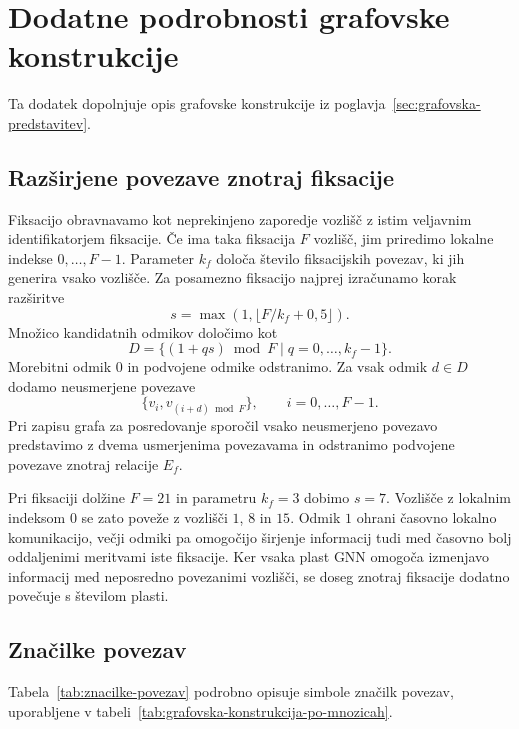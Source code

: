 \chapter{Dodatne podrobnosti grafovske konstrukcije}
\label{app:grafi}

Ta dodatek dopolnjuje opis grafovske konstrukcije iz poglavja~\ref{sec:grafovska-predstavitev}.

\section{Razširjene povezave znotraj fiksacije}
\label{app:razsirjene-fiksacijske-povezave}

Fiksacijo obravnavamo kot neprekinjeno zaporedje vozlišč z istim veljavnim identifikatorjem fiksacije.
Če ima taka fiksacija $F$ vozlišč, jim priredimo lokalne indekse $0,\ldots,F-1$.
Parameter $k_f$ določa število fiksacijskih povezav, ki jih generira vsako vozlišče.
Za posamezno fiksacijo najprej izračunamo korak razširitve
\begin{equation}
    s = \max(1, \lfloor F/k_f + 0{,}5 \rfloor).
\end{equation}
Množico kandidatnih odmikov določimo kot
\begin{equation}
    D = \{(1 + q s) \bmod F \mid q = 0,\ldots,k_f-1\}.
\end{equation}
Morebitni odmik $0$ in podvojene odmike odstranimo.
Za vsak odmik $d \in D$ dodamo neusmerjene povezave
\begin{equation}
    \{v_i, v_{(i+d)\bmod F}\},
    \qquad i = 0,\ldots,F-1.
\end{equation}
Pri zapisu grafa za posredovanje sporočil vsako neusmerjeno povezavo predstavimo z dvema usmerjenima povezavama in odstranimo podvojene povezave znotraj relacije $E_f$.

Pri fiksaciji dolžine $F=21$ in parametru $k_f=3$ dobimo $s=7$.
Vozlišče z lokalnim indeksom $0$ se zato poveže z vozlišči $1$, $8$ in $15$.
Odmik $1$ ohrani časovno lokalno komunikacijo, večji odmiki pa omogočijo širjenje informacij tudi med časovno bolj oddaljenimi meritvami iste fiksacije.
Ker vsaka plast GNN omogoča izmenjavo informacij med neposredno povezanimi vozlišči, se doseg znotraj fiksacije dodatno povečuje s številom plasti.

\section{Značilke povezav}

Tabela~\ref{tab:znacilke-povezav} podrobno opisuje simbole značilk povezav, uporabljene v tabeli~\ref{tab:grafovska-konstrukcija-po-mnozicah}.

